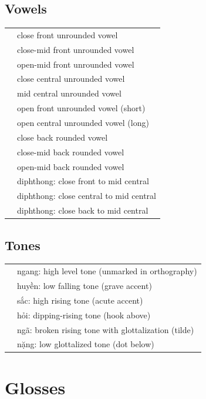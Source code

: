 \documentclass{article}
\begin{document}
\subsection{Vowels}

\begin{xltabular}{\textwidth}{lL}
   & close front unrounded vowel \\
   & close-mid front unrounded vowel \\
   & open-mid front unrounded vowel \\
   & close central unrounded vowel \\
   & mid central unrounded vowel \\
   & open front unrounded vowel (short) \\
   & open central unrounded vowel (long) \\
   & close back rounded vowel \\
   & close-mid back rounded vowel \\
   & open-mid back rounded vowel \\
   & diphthong: close front to mid central \\
   & diphthong: close central to mid central \\
   & diphthong: close back to mid central \\
\end{xltabular}

\subsection{Tones}

\begin{xltabular}{\textwidth}{lL}
   & ngang: high level tone (unmarked in orthography) \\
   & huyền: low falling tone (grave accent) \\
   & sắc: high rising tone (acute accent) \\
   & hỏi: dipping-rising tone (hook above) \\
   & ngã: broken rising tone with glottalization (tilde) \\
   & nặng: low glottalized tone (dot below) \\
\end{xltabular}

\newpage\section{Glosses}
\end{document}
